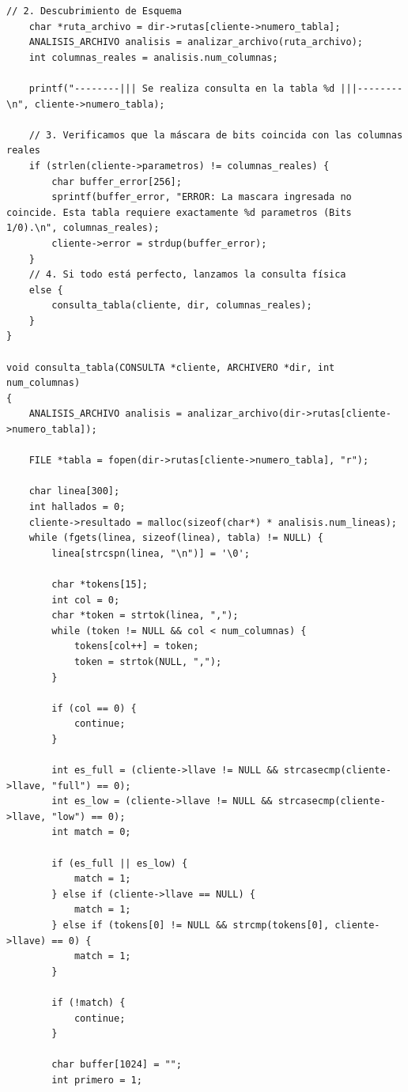 \documentclass[12pt]{article}
\begin{document}
\begin{lstlisting}[style=estiloC ,title={Código 2. Servidor TCP (consulta.c)}]
    // 2. Descubrimiento de Esquema
    char *ruta_archivo = dir->rutas[cliente->numero_tabla];
    ANALISIS_ARCHIVO analisis = analizar_archivo(ruta_archivo);
    int columnas_reales = analisis.num_columnas;

    printf("--------||| Se realiza consulta en la tabla %d |||--------\n", cliente->numero_tabla);

    // 3. Verificamos que la máscara de bits coincida con las columnas reales
    if (strlen(cliente->parametros) != columnas_reales) {
        char buffer_error[256];
        sprintf(buffer_error, "ERROR: La mascara ingresada no coincide. Esta tabla requiere exactamente %d parametros (Bits 1/0).\n", columnas_reales);
        cliente->error = strdup(buffer_error);
    } 
    // 4. Si todo está perfecto, lanzamos la consulta física
    else {
        consulta_tabla(cliente, dir, columnas_reales);
    }
}

void consulta_tabla(CONSULTA *cliente, ARCHIVERO *dir, int num_columnas)
{
    ANALISIS_ARCHIVO analisis = analizar_archivo(dir->rutas[cliente->numero_tabla]);

    FILE *tabla = fopen(dir->rutas[cliente->numero_tabla], "r");

    char linea[300];
    int hallados = 0;
    cliente->resultado = malloc(sizeof(char*) * analisis.num_lineas);
    while (fgets(linea, sizeof(linea), tabla) != NULL) {
        linea[strcspn(linea, "\n")] = '\0';

        char *tokens[15];
        int col = 0;
        char *token = strtok(linea, ",");
        while (token != NULL && col < num_columnas) {
            tokens[col++] = token;
            token = strtok(NULL, ",");
        }

        if (col == 0) {
            continue;
        }

        int es_full = (cliente->llave != NULL && strcasecmp(cliente->llave, "full") == 0);
        int es_low = (cliente->llave != NULL && strcasecmp(cliente->llave, "low") == 0);
        int match = 0;

        if (es_full || es_low) {
            match = 1;
        } else if (cliente->llave == NULL) {
            match = 1;
        } else if (tokens[0] != NULL && strcmp(tokens[0], cliente->llave) == 0) {
            match = 1;
        }

        if (!match) {
            continue;
        }

        char buffer[1024] = "";
        int primero = 1;


\end{lstlisting}
\end{document}
